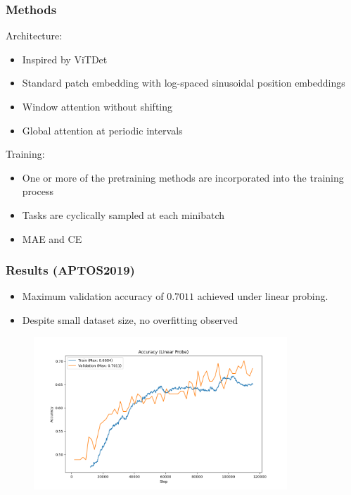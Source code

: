 \documentclass{beamer}
\begin{document}
\begin{frame}
   \frametitle{Methods}
   Architecture:
   \begin{itemize}
        \item Inspired by ViTDet \cite{li2022exploring}
        \item Standard patch embedding with log-spaced sinusoidal position embeddings
        \item Window attention without shifting
        \item Global attention at periodic intervals
   \end{itemize}
   \vspace{1em}
   Training:
   \begin{itemize}
        \item One or more of the pretraining methods are incorporated into the training process
        \item Tasks are cyclically sampled at each minibatch
        \item MAE and CE
   \end{itemize}
\end{frame}

\begin{frame}
   \frametitle{Results (APTOS2019)}
   \begin{itemize}
        \item Maximum validation accuracy of $0.7011$ achieved under linear probing.
        \item Despite small dataset size, no overfitting observed
   \end{itemize}
   \begin{figure}
       \centering
       \includegraphics[width=0.85\textwidth]{train_val_accuracies.png}
   \end{figure}
\end{frame}
\end{document}
